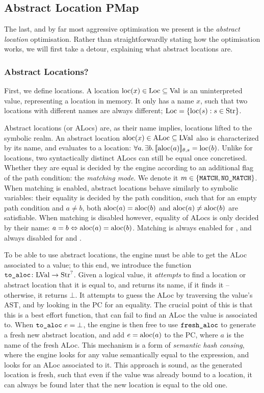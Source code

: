\subsection{Abstract Location PMap}

The last, and by far most aggressive optimisation we present is the \emph{abstract location} optimisation. Rather than straightforwardly stating how the optimisation works, we will first take a detour, explaining what abstract locations are.

\subsubsection{Abstract Locations?}

First, we define locations. A location $\text{loc}(x)\in\text{Loc}\subseteq\text{Val}$ is an uninterpreted value, representing a location in memory. It only has a name $x$, such that two locations with different names are always different; $\text{Loc}=\{\text{loc}(s):s\in\text{Str}\}$.

Abstract locations (or ALocs) are, as their name implies, locations lifted to the symbolic realm. An abstract location $\text{aloc}(x)\in\text{ALoc}\subseteq\text{LVal}$ also is characterized by its name, and evaluates to a location: $\forall a\ldotp \exists b\ldotp \llbracket\text{aloc}(a)\rrbracket_{\theta,s}=\text{loc}(b)$. Unlike for locations, two syntactically distinct ALocs can still be equal once concretised. Whether they are equal is decided by the engine according to an additional flag of the path condition: the \emph{matching mode}. We denote it $m\in\{\texttt{MATCH},\texttt{NO\_MATCH}\}$. When matching is enabled, abstract locations behave similarly to symbolic variables: their equality is decided by the path condition, such that for an empty path condition and $a\neq b$, both $\text{aloc}(a)=\text{aloc}(b)$ and $\text{aloc}(a)\neq\text{aloc}(b)$ are satisfiable. When matching is disabled however, equality of ALocs is only decided by their name: $a=b\Leftrightarrow \text{aloc}(a)=\text{aloc}(b)$. Matching is always enabled for \consume, and always disabled for \produce{} and \execac.

To be able to use abstract locations, the engine must be able to get the ALoc associated to a value; to this end, we introduce the function $\texttt{to\_aloc}\colon \text{LVal}\rightarrow\text{Str}^?$. Given a logical value, it \emph{attempts} to find a location or abstract location that it is equal to, and returns its name, if it finds it -- otherwise, it returns $\bot$. It attempts to guess the ALoc by traversing the value's AST, and by looking in the PC for an equality. The crucial point of this is that this is a best effort function, that can fail to find an ALoc the value is associated to. When $\texttt{to\_aloc}~e=\bot$, the engine is then free to use $\texttt{fresh\_aloc}$ to generate a fresh new abstract location, and add $e=\text{aloc}(a)$ to the PC, where $a$ is the name of the fresh ALoc. This mechanism is a form of \emph{semantic hash consing}, where the engine looks for any value semantically equal to the expression, and looks for an ALoc associated to it. This approach is sound, as the generated location is fresh, such that even if the value was already bound to a location, it can always be found later that the new location is equal to the old one.

